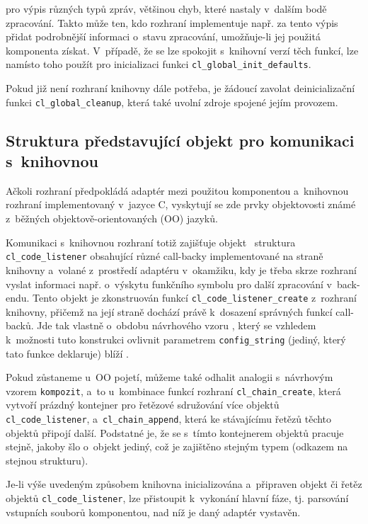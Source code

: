 pro výpis různých typů zpráv, většinou chyb, které nastaly v~dalším
bodě zpracování. Takto může ten, kdo rozhraní implementuje
např. za tento výpis přidat podrobnější informaci o~stavu zpracování,
umožňuje-li jej použitá komponenta získat. V~případě, že se lze
spokojit s~knihovní verzí těch funkcí, lze namísto toho
použít pro inicializaci funkci \texttt{cl\_global\_init\_defaults}.

Pokud již není rozhraní knihovny dále potřeba, je žádoucí
zavolat deinicializační funkci \texttt{cl\_global\_cleanup}, která také
uvolní zdroje spojené jejím provozem.

\subsection{Struktura představující objekt pro komunikaci s~knihovnou}
\label{code-listener:objekt}
Ačkoli rozhraní předpokládá adaptér mezi použitou komponentou a~knihovnou
rozhraní implementovaný v~jazyce C, vyskytují se zde prvky
objektovosti známé z~běžných objektově-orientovaných (OO) jazyků.

Komunikaci s~knihovnou rozhraní totiž zajišťuje objekt \ndash\ struktura
\texttt{cl\_code\_listener} obsahující různé call-backy implementované
na straně knihovny a~volané z~prostředí adaptéru v~okamžiku, kdy je třeba
skrze rozhraní vyslat informaci např. o~výskytu funkčního symbolu pro
další zpracování v~back-endu. Tento objekt je zkonstruován
funkcí%
\linebreak
\texttt{cl\_code\_listener\_create} z~rozhraní knihovny, přičemž
na její straně dochází právě k~dosazení správných funkcí call-backů.
Jde tak vlastně o~obdobu návrhového vzoru , který se
vzhledem k~možnosti tuto konstrukci ovlivnit parametrem
\texttt{config\_string} (jediný, který tato funkce deklaruje) blíží
.

Pokud zůstaneme u~OO pojetí, můžeme také odhalit analogii s~návrhovým
vzorem \texttt{kompozit}, a~to u~kombinace funkcí
rozhraní \texttt{cl\_chain\_create}, která vytvoří prázdný kontejner
pro řetězové sdružování více objektů \texttt{cl\_code\_listener},
a~\texttt{cl\_chain\_append}, která ke stávajícímu řetězů těchto
objektů připojí další. Podstatné je, že se s~tímto kontejnerem
objektů pracuje stejně, jakoby šlo o~objekt jediný, což je zajištěno
stejným typem (odkazem na stejnou strukturu).

Je-li výše uvedeným způsobem knihovna inicializována a~připraven
objekt či řetěz objektů \texttt{cl\_code\_listener}, lze přistoupit
k~vykonání hlavní fáze, tj. parsování vstupních souborů komponentou,
nad níž je daný adaptér vystavěn.

